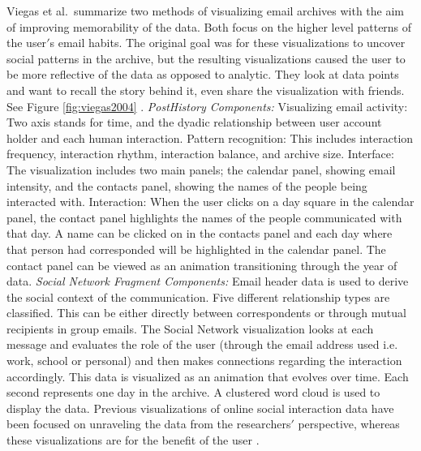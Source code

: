 \documentclass{egpubl}
\begin{document}
Viegas et al.\ summarize two methods of visualizing email archives with the aim of improving memorability of the data. Both focus on the higher level patterns of the user$'$s email habits. The original goal was for these visualizations to uncover social patterns in the archive, but the resulting visualizations caused the user to be more reflective of the data as opposed to analytic. They look at data points and want to recall the story behind it, even share the visualization with friends. See Figure \ref{fig:viegas2004} \cite{viegas2004}.
\textit{PostHistory Components:}
Visualizing email activity: Two axis stands for time, and the dyadic relationship between user account holder and each human interaction.
Pattern recognition: This includes interaction frequency, interaction rhythm, interaction balance, and archive size.
Interface: The visualization includes two main panels; the calendar panel, showing email intensity, and the contacts panel, showing the names of the people being interacted with. 
Interaction: When the user clicks on a day square in the calendar panel, the contact panel highlights the names of the people communicated with that day. A name can be clicked on in the contacts panel and each day where that person had corresponded will be highlighted in the calendar panel. The contact panel can be viewed as an animation transitioning through the year of data.
\textit{Social Network Fragment Components:}
Email header data is used to derive the social context of the communication.
Five different relationship types are classified. This can be either directly between correspondents or through mutual recipients in group emails.
The Social Network visualization looks at each message and evaluates the role of the user (through the email address used i.e. work, school or personal) and then makes connections regarding the interaction accordingly. 
This data is visualized as an animation that evolves over time. Each second represents one day in the archive. A clustered word cloud is used to display the data.
Previous visualizations of online social interaction data have been focused on unraveling the data from the researchers$'$ perspective, whereas these visualizations are for the benefit of the user \cite{boyd2002,donath1995}.
\end{document}
